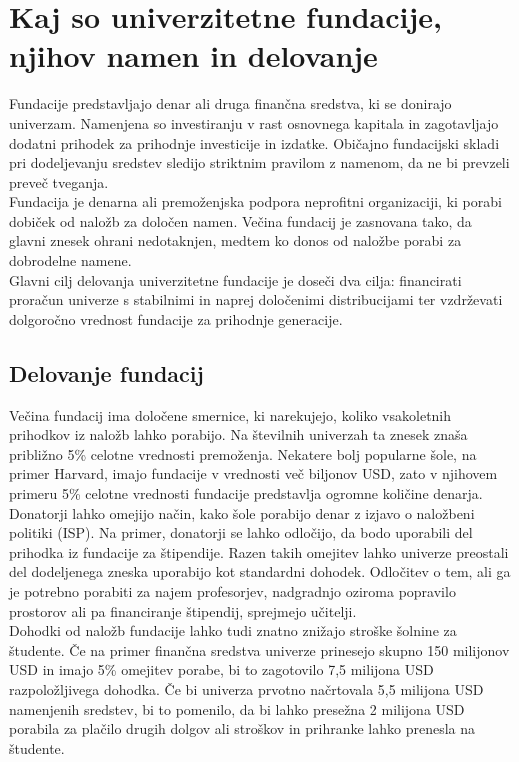 \documentclass[12pt, a4paper]{article}
\begin{document}
\section{Kaj so univerzitetne fundacije, njihov namen in delovanje}


Fundacije predstavljajo denar ali druga finančna sredstva, ki se donirajo univerzam. Namenjena so investiranju v rast osnovnega kapitala in zagotavljajo dodatni prihodek za prihodnje investicije in izdatke. Običajno fundacijski skladi pri dodeljevanju sredstev sledijo striktnim pravilom z namenom, da ne bi prevzeli preveč tveganja. \\

Fundacija je denarna ali premoženjska podpora neprofitni organizaciji, ki porabi dobiček od naložb za določen namen. Večina fundacij je zasnovana tako, da glavni znesek ohrani nedotaknjen, medtem ko donos od naložbe porabi za dobrodelne namene. \\

Glavni cilj delovanja univerzitetne fundacije je doseči dva cilja: financirati proračun univerze s stabilnimi in naprej določenimi distribucijami ter vzdrževati dolgoročno vrednost fundacije za prihodnje generacije. \cite{harvard-porocilo}

\subsection{Delovanje fundacij}

Večina fundacij ima določene smernice, ki narekujejo, koliko vsakoletnih prihodkov iz naložb lahko porabijo. Na številnih univerzah ta znesek znaša približno 5\% celotne vrednosti premoženja. Nekatere bolj popularne šole, na primer Harvard, imajo fundacije v vrednosti več biljonov USD, zato v njihovem primeru 5\% celotne vrednosti fundacije predstavlja ogromne količine denarja. \cite{Investopedia}\\

Donatorji lahko omejijo način, kako šole porabijo denar z izjavo o naložbeni politiki (ISP). Na primer, donatorji se lahko odločijo, da bodo uporabili del prihodka iz fundacije za štipendije. Razen takih omejitev lahko univerze preostali del dodeljenega zneska uporabijo kot standardni dohodek. Odločitev o tem, ali ga je potrebno porabiti za najem profesorjev, nadgradnjo oziroma popravilo prostorov ali pa financiranje štipendij, sprejmejo učitelji. \\

Dohodki od naložb fundacije lahko tudi znatno znižajo stroške šolnine za študente. Če na primer finančna sredstva univerze prinesejo skupno 150 milijonov USD in imajo 5\% omejitev porabe, bi to zagotovilo 7,5 milijona USD razpoložljivega dohodka. Če bi univerza prvotno načrtovala 5,5 milijona USD namenjenih sredstev, bi to pomenilo, da bi lahko presežna 2 milijona USD porabila za plačilo drugih dolgov ali stroškov in prihranke lahko prenesla na študente. \cite{Investopedia}\\
\end{document}
